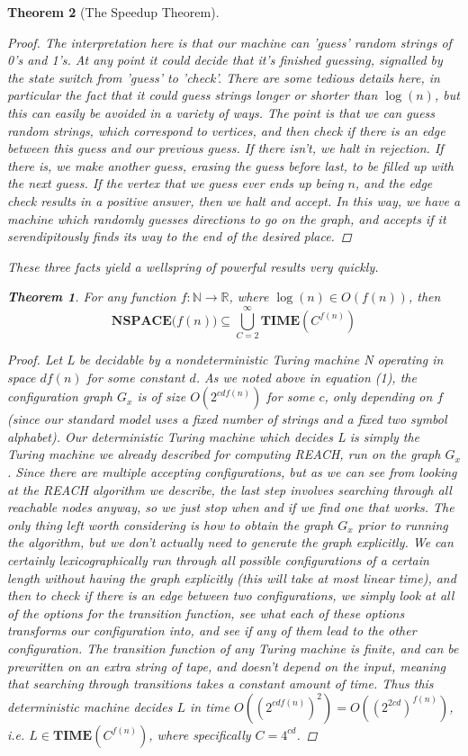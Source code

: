 \documentclass{article}
\theoremstyle{definition}
\theoremstyle{plain}
\theoremstyle{theorem}
\newtheorem{theorem}{Theorem}[section]
\begin{document}
\begin{theorem}[The Speedup Theorem]
\begin{proof}
The interpretation here is that our machine can 'guess' random strings of 0's and 1's. At any point it could decide that it's finished guessing, signalled by the state switch from 'guess' to 'check'. There are some tedious details here, in particular the fact that it could guess strings longer or shorter than $\log(n)$, but this can easily be avoided in a variety of ways. The point is that we can guess random strings, which correspond to vertices, and then check if there is an edge between this guess and our previous guess. If there isn't, we halt in rejection. If there is, we make another guess, erasing the guess before last, to be filled up with the next guess. If the vertex that we guess ever ends up being $n$, and the edge check results in a positive answer, then we halt and accept. In this way, we have a machine which randomly guesses directions to go on the graph, and accepts if it serendipitously finds its way to the end of the desired place.
\end{proof}
These three facts yield a wellspring of powerful results very quickly.
\begin{theorem}
For any function $f:\mathbb{N} \to \mathbb{R}$, where $\log(n) \in O(f(n))$, then
    \[ \textbf{NSPACE($f(n)$)} \subseteq \bigcup_{C=2}^{\infty}\textbf{TIME$(C^{f(n)})$} \]
\end{theorem}
\begin{proof}
Let L be decidable by a nondeterministic Turing machine N operating in space $df(n)$ for some constant $d$. As we noted above in equation (1), the configuration graph $G_x$ is of size $O(2^{cdf(n)})$ for some $c$, only depending on $f$ (since our standard model uses a fixed number of strings and a fixed two symbol alphabet). Our deterministic Turing machine which decides L is simply the Turing machine we already described for computing REACH, run on the graph $G_x$. Since there are multiple accepting configurations, but as we can see from looking at the REACH algorithm we describe, the last step involves searching through all reachable nodes anyway, so we just stop when and if we find one that works. The only thing left worth considering is how to obtain the graph $G_x$ prior to running the algorithm, but we don't actually need to generate the graph explicitly. We can certainly lexicographically run through all possible configurations of a certain length without having the graph explicitly (this will take at most linear time), and then to check if there is an edge between two configurations, we simply look at all of the options for the transition function, see what each of these options transforms our configuration into, and see if any of them lead to the other configuration. The transition function of any Turing machine is finite, and can be prewritten on an extra string of tape, and doesn't depend on the input, meaning that searching through transitions takes a constant amount of time. Thus this deterministic machine decides $L$ in time $O((2^{cdf(n)})^2) = O((2^{2cd})^{f(n)})$, i.e. $L \in \textbf{TIME}(C^{f(n)})$, where specifically $C = 4^{cd}$.

\end{proof}
\end{theorem}
\end{document}
